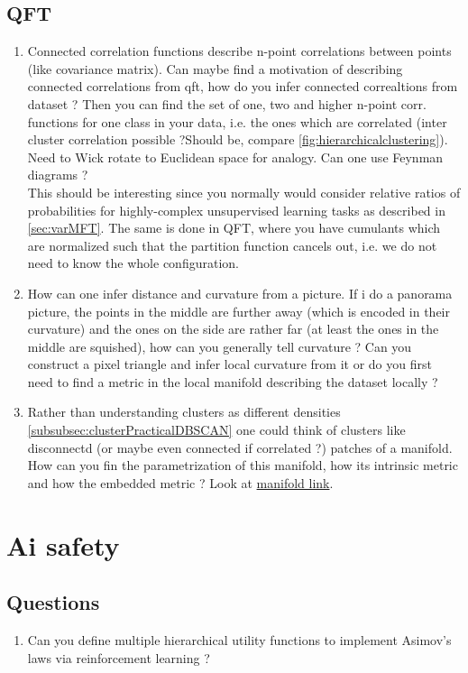 \subsection{QFT}
\begin{enumerate}
	\item Connected correlation functions describe n-point correlations between points (like covariance matrix). Can maybe find a motivation of describing connected correlations from qft, how do you infer connected correaltions from dataset ? Then you can find the set of one, two and higher n-point corr. functions for one class in your data, i.e. the ones which are correlated (inter cluster correlation possible ?Should be, compare \ref{fig:hierarchicalclustering}). Need to Wick rotate to Euclidean space for analogy. Can one use Feynman diagrams ?\\
	This should be interesting since you normally would consider relative ratios of probabilities for highly-complex unsupervised learning tasks as described in \ref{sec:varMFT}. The same is done in QFT, where you have cumulants which are normalized such that the partition function cancels out, i.e. we do not need to know the whole configuration.
	\item How can one infer distance and curvature from a picture. If i do a panorama picture, the points in the middle are further away (which is encoded in their curvature) and the ones on the side are rather far (at least the ones in the middle are squished), how can you generally tell curvature ? Can you construct a pixel triangle and infer local curvature from it or do you first need to find a metric in the local manifold describing the dataset locally ?
	\item Rather than understanding clusters as different densities  \ref{subsubsec:clusterPracticalDBSCAN} one could think of clusters like disconnectd (or maybe even connected if correlated ?) patches of a manifold. How can you fin the parametrization of this manifold, how its intrinsic metric and how the embedded metric ? Look at \href{https://arxiv.org/pdf/1802.03426.pdf}{manifold link}.
\end{enumerate}
\section{Ai safety}
\subsection{Questions}
\begin{enumerate}
	\item Can you define multiple hierarchical utility functions to implement Asimov's laws via reinforcement learning ?
\end{enumerate}
